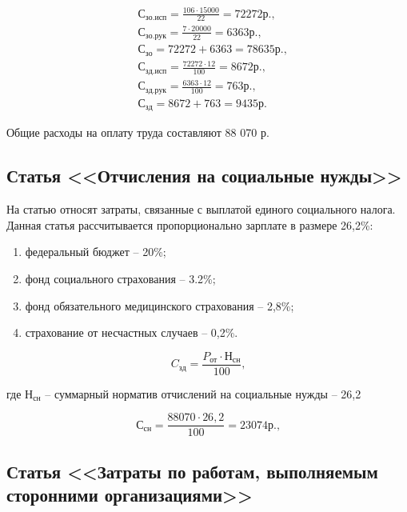 \begin{align}
&С_{зо.исп} = \frac{106 \cdot 15 000}{22} = 72 272 р.\mbox{,}\\
&С_{зо.рук} = \frac{7 \cdot 20 000}{22} = 6 363 р.\mbox{,}\\
&С_{зо} = 72 272 + 6 363 = 78 635 р.\mbox{,}\\
&С_{зд.исп} = \frac{72 272 \cdot 12}{100} = 8 672 р.\mbox{,}\\
&С_{зд.рук} = \frac{6 363 \cdot 12}{100} = 763 р.\mbox{,}\\
&С_{зд} = 8 672 + 763 = 9 435 р.
\end{align}

Общие расходы на оплату труда составляют 88 070 р.

\subsection{Статья <<Отчисления на социальные нужды>>}

На статью относят затраты, связанные с выплатой единого социального налога.
Данная статья рассчитывается пропорционально зарплате в размере 26,2\%:
\begin{enumerate}
\item федеральный бюджет – 20\%;
\item фонд социального страхования – 3.2\%;
\item фонд обязательного медицинского страхования – 2,8\%;
\item страхование от несчастных случаев – 0,2\%.
\end{enumerate}

\begin{equation}
C_{зд} = \frac{P_{от} \cdot Н_{сн}}{100}\mbox{,}
\label{F:F3}
\end{equation}

где $Н_{сн}$ – суммарный норматив отчислений на социальные нужды – 26,2%

\begin{equation}
С_{сн} = \frac{88070 \cdot 26,2}{100} = 23 074 р.\mbox{,}
\label{F:F4}
\end{equation}

\subsection{Статья <<Затраты  по работам, выполняемым сторонними организациями>>}

